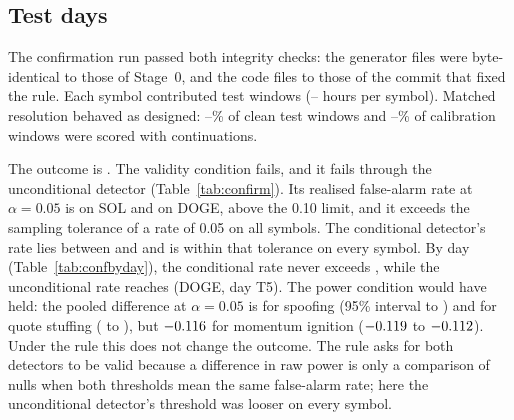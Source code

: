 \documentclass[journal]{IEEEtran}
\begin{document}
\begin{table}[t]
\centering
\caption{The conditional detector's realised false-alarm rate at $\alpha=0.05$ by validation day, under the
Stage-0 design and under V3. Day~4 is calibrated on day~3 in both.}
\label{tab:byday}
\footnotesize
\setlength{\tabcolsep}{4pt}

\end{table}

\subsection{Test days}
\label{sec:testresults}
The confirmation run passed both integrity checks: the generator files were byte-identical to those of Stage~0,
and the code files to those of the commit that fixed the rule. Each symbol contributed \nTestWinLo{} test windows
(\confHoursLo--\confHoursHi{} hours per symbol). Matched resolution behaved as designed: --\%
of clean test windows and --\% of calibration windows were scored with
\Mrefine{} continuations.

The outcome is \textbf{\confOutcome}. The validity condition fails, and it fails through the unconditional
detector (Table~\ref{tab:confirm}). Its realised false-alarm rate at $\alpha=0.05$ is \faConfUncSol{} on SOL and
\faConfUncDoge{} on DOGE, above the 0.10 limit, and it exceeds the sampling tolerance of a rate of 0.05 on all
\nAboveTwoSEConfUnc{} symbols. The conditional detector's rate lies between \faConfGenXrp{} and \faConfMaxGen{}
and is within that tolerance on every symbol. By day (Table~\ref{tab:confbyday}), the conditional rate never
exceeds \faConfDayMaxGen, while the unconditional rate reaches \faConfDayMaxUnc{} (DOGE, day T5). The power condition would have held: the pooled difference at $\alpha=0.05$ is
\dConfSpoof{} for spoofing (95\% interval \dConfLoSpoof{} to \dConfHiSpoof) and \dConfStuff{} for quote stuffing
(\dConfLoStuff{} to \dConfHiStuff), but \(-0.116\) for momentum ignition (\(-0.119\) to
\(-0.112\)). Under the rule this does not change the outcome. The rule asks for both detectors to be valid
because a difference in raw power is only a comparison of nulls when both thresholds mean the same false-alarm
rate; here the unconditional detector's threshold was looser on every symbol.

\begin{table}[t]
\centering
\caption{Test days: power at $\alpha=0.05$ per symbol (mean over each family's strength grid), the pooled
difference with the 95\% interval of the decision rule, and the realised false-alarm rate on clean test windows.
Cond.: generator-conditional null; uncond.: unconditional null.}
\label{tab:confirm}
\setlength{\tabcolsep}{3pt}
\resizebox{\columnwidth}{!}{}
\end{table}
\end{document}
